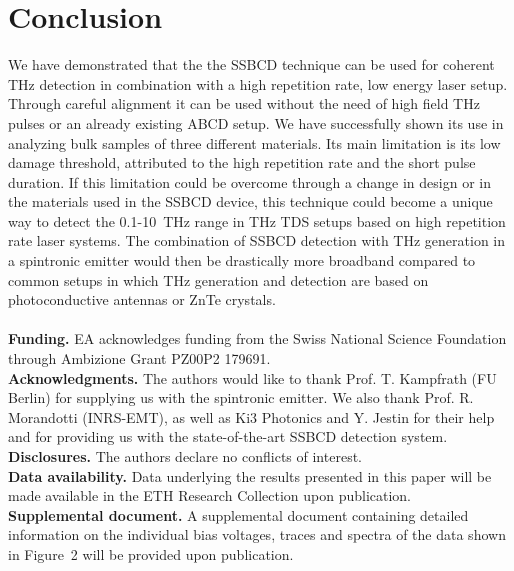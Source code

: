 \documentclass{article}
\begin{document}
\section{Conclusion}
We have demonstrated that the the SSBCD technique can be used for coherent THz detection in combination with a high repetition rate, low energy laser setup. Through careful alignment it can be used without the need of high field THz pulses or an already existing ABCD setup. We have successfully shown its use in analyzing bulk samples of three different materials. Its main limitation is its low damage threshold, attributed to the high repetition rate and the short pulse duration. If this limitation could be overcome through a change in design or in the materials used in the SSBCD device, this technique could become a unique way to detect the \mbox{0.1-10 THz} range in THz TDS setups based on high repetition rate laser systems. The combination of SSBCD detection with THz generation in a spintronic emitter would then be drastically more broadband compared to common setups in which THz generation and detection are based on photoconductive antennas or ZnTe crystals.
\\~\\
\small
\textbf{Funding.}\quad
EA acknowledges funding from the Swiss National Science Foundation through Ambizione Grant PZ00P2 179691.\\[5pt]
\textbf{Acknowledgments.} \quad
The authors would like to thank Prof. T. Kampfrath (FU Berlin) for supplying us with the spintronic emitter. We also thank Prof. R. Morandotti (INRS-EMT), as well as Ki3 Photonics and Y. Jestin for their help and for providing us with the state-of-the-art SSBCD detection system.\\[5pt]
\textbf{Disclosures.} \quad
The authors declare no conflicts of interest.\\[5pt]
\textbf{Data availability.} \quad Data underlying the results presented in this paper will be made available in the ETH Research Collection upon publication.\\[5pt]
\textbf{Supplemental document.} \quad
A supplemental document containing detailed information on the individual bias voltages, traces and spectra of the data shown in \mbox{Figure 2} will be provided upon publication.\\~\\


{}

\end{document}
